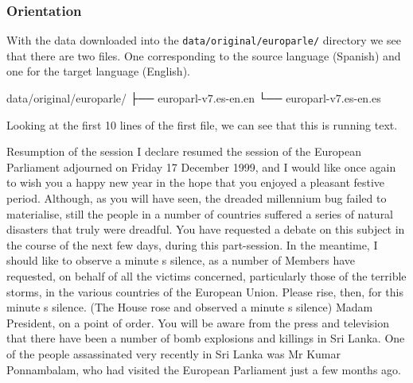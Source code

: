 \documentclass[
]{article}
\newenvironment{Shaded}{\begin{snugshade}}{\end{snugshade}}
\newcommand{\ExtensionTok}[1]{#1}
\newcommand{\NormalTok}[1]{#1}
\begin{document}
\hypertarget{orientation}{%
\subsubsection{Orientation}\label{orientation}}

With the data downloaded into the \texttt{data/original/europarle/} directory we see that there are two files. One corresponding to the source language (Spanish) and one for the target language (English).

\begin{Shaded}
\begin{Highlighting}[]
\ExtensionTok{data/original/europarle/}
\ExtensionTok{├──}\NormalTok{ europarl{-}v7.es{-}en.en}
\ExtensionTok{└──}\NormalTok{ europarl{-}v7.es{-}en.es}
\end{Highlighting}
\end{Shaded}

Looking at the first 10 lines of the first file, we can see that this is running text.

\begin{Shaded}
\begin{Highlighting}[]
\NormalTok{Resumption of the session}
\NormalTok{I declare resumed the session of the European Parliament adjourned on Friday 17 December 1999, and I would like once again to wish you a happy new year in the hope that you enjoyed a pleasant festive period.}
\NormalTok{Although, as you will have seen, the dreaded \textquotesingle{}millennium bug\textquotesingle{} failed to materialise, still the people in a number of countries suffered a series of natural disasters that truly were dreadful.}
\NormalTok{You have requested a debate on this subject in the course of the next few days, during this part{-}session.}
\NormalTok{In the meantime, I should like to observe a minute\textquotesingle{} s silence, as a number of Members have requested, on behalf of all the victims concerned, particularly those of the terrible storms, in the various countries of the European Union.}
\NormalTok{Please rise, then, for this minute\textquotesingle{} s silence.}
\NormalTok{(The House rose and observed a minute\textquotesingle{} s silence)}
\NormalTok{Madam President, on a point of order.}
\NormalTok{You will be aware from the press and television that there have been a number of bomb explosions and killings in Sri Lanka.}
\NormalTok{One of the people assassinated very recently in Sri Lanka was Mr Kumar Ponnambalam, who had visited the European Parliament just a few months ago.}
\end{Highlighting}
\end{Shaded}
\end{document}
